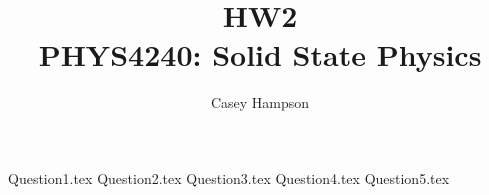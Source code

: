 \documentclass[titlepage]{article}
\title{HW2 \\[5pt] PHYS4240: Solid State Physics}
\author{Casey Hampson}
\begin{document}
    \maketitle
    \pagebreak

    {Question1.tex}
    {Question2.tex}
    {Question3.tex}
    {Question4.tex}
    {Question5.tex}
\end{document}

